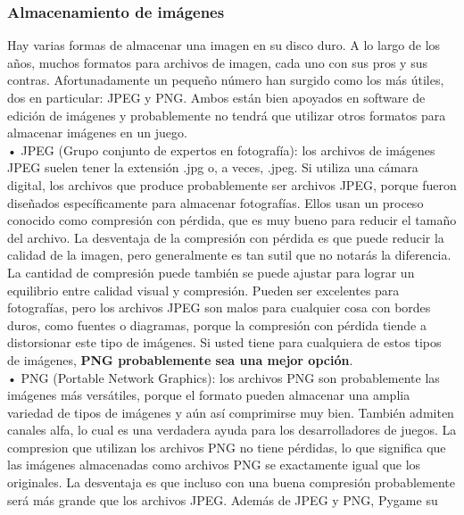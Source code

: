 \subsubsection{Almacenamiento de imágenes}

Hay varias formas de almacenar una imagen en su disco duro. A lo largo de los años, muchos formatos
para archivos de imagen, cada uno con sus pros y sus contras. Afortunadamente un pequeño número
han surgido como los más útiles, dos en particular: JPEG y PNG. Ambos están bien apoyados
en software de edición de imágenes y probablemente no tendrá que utilizar otros formatos para
almacenar imágenes en un juego.\\

• JPEG (Grupo conjunto de expertos en fotografía): los archivos de imágenes JPEG suelen tener la extensión
.jpg o, a veces, .jpeg. Si utiliza una cámara digital, los archivos que produce probablemente
ser archivos JPEG, porque fueron diseñados específicamente para almacenar fotografías. Ellos usan un
proceso conocido como compresión con pérdida, que es muy bueno para reducir el tamaño del archivo. 
La desventaja de la compresión con pérdida es que puede reducir la calidad de la imagen, pero generalmente
es tan sutil que no notarás la diferencia. 
La cantidad de compresión puede también se puede ajustar para lograr un equilibrio entre calidad visual y compresión. Pueden ser
excelentes para fotografías, pero los archivos JPEG son malos para cualquier cosa con bordes duros, como fuentes o diagramas,
porque la compresión con pérdida tiende a distorsionar este tipo de imágenes. Si usted tiene
para cualquiera de estos tipos de imágenes, {\bf PNG probablemente sea una mejor opción}.\\


• PNG (Portable Network Graphics): los archivos PNG son probablemente las imágenes más versátiles, porque  el
formato pueden almacenar una amplia variedad de tipos de imágenes y aún así comprimirse muy bien.
También admiten canales alfa, lo cual es una verdadera ayuda para los desarrolladores de juegos. 
La compresion que utilizan los archivos PNG no tiene pérdidas, lo que significa que las imágenes almacenadas como archivos PNG se
exactamente igual que los originales. La desventaja es que incluso con una buena compresión probablemente será más grande que los archivos JPEG. Además de JPEG y PNG, Pygame su


